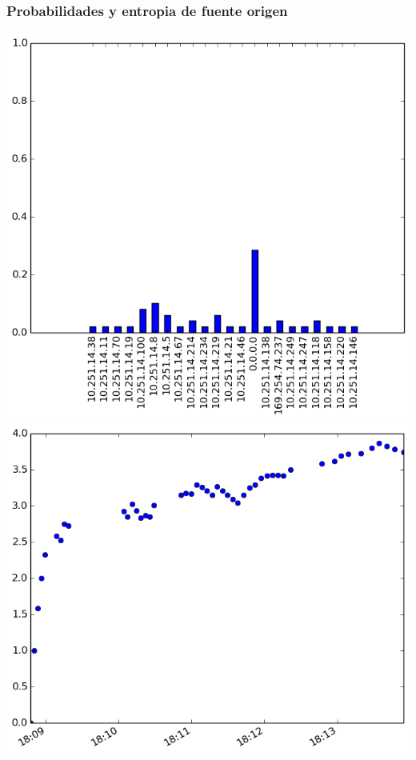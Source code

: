 \subsubsection{Probabilidades y entropia de fuente origen}
\includegraphics[scale=0.33]{../experimentacion-svilerino/starbucks/full-experiment-1/histogram_src_probabilities.png}
\includegraphics[scale=0.33]{../experimentacion-svilerino/starbucks/full-experiment-1/entropy_src.png}

